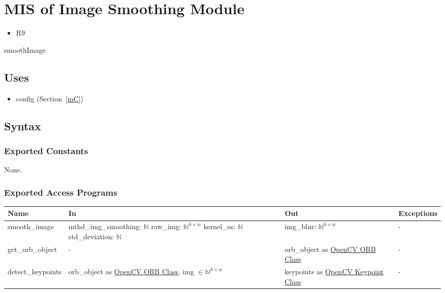 \documentclass[12pt, titlepage]{article}
\begin{document}
\section{MIS of Image Smoothing Module} \label{mIS}
\begin{itemize}
  \item R9
\end{itemize}


smoothImage

\subsection{Uses}
\begin{itemize}
  \item config (Section~\ref{mC})
\end{itemize}

\subsection{Syntax}

\subsubsection{Exported Constants}
None.
\subsubsection{Exported Access Programs}
\begin{center}
  \begin{tabular}{p{4cm} p{4.5cm} p{4cm} p{2cm}}
  \hline
  \textbf{Name} & \textbf{In} & \textbf{Out} & \textbf{Exceptions} \\
  \hline
  smooth\_image
  & mthd\_img\_smoothing: $\mathbb{N}$ \newline
  raw\_img: $\mathbb{N}^{h \times w}$ \newline
  kernel\_sz: $\mathbb{N}$ \newline
  std\_deviation: $\mathbb{N}$
  & img\_blur: $\mathbb{N}^{h \times w}$
  & - \\
  \hline
  get\_orb\_object 
  & -
  & orb\_object as \href{https://docs.opencv.org/3.4/db/d95/classcv_1_1ORB.html}{OpenCV ORB Class}
  & - \\
  \hline
  detect\_keypoints 
  & orb\_object as \href{https://docs.opencv.org/3.4/db/d95/classcv_1_1ORB.html}{OpenCV ORB Class}, \newline
  img $\in \mathbb{N}^{h \times w}$
  & keypoints as \href{https://docs.opencv.org/3.4/d2/d29/classcv_1_1KeyPoint.html}{OpenCV Keypoint Class}
  & - \\
  \hline
  \end{tabular}
  \end{center}
\end{document}
